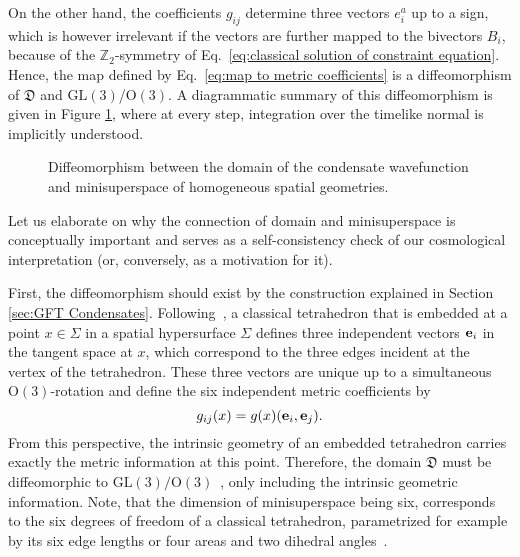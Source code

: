 \documentclass[11pt,a4paper]{article}
\newcommand{\C}{\mathbb C}
\newcommand{\SL}{\text{SL$(2,\C)$}}
\renewcommand{\hom}{\mathfrak{hom}(2)}
\newcommand{\Hom}{\text{Hom}(2)}
\begin{document}
On the other hand, the coefficients $g_{ij}$ determine three vectors $e_i^a$ up to a sign, which is however irrelevant if the vectors are further mapped to the bivectors $B_i$, because of the $\mathbb{Z}_2$-symmetry of Eq.~\eqref{eq:classical solution of constraint equation}. Hence, the map defined by Eq.~\eqref{eq:map to metric coefficients} is a diffeomorphism of $\mathfrak{D}$ and $\text{GL}(3)$/$\text{O}(3)$. A diagrammatic summary of this diffeomorphism is given in Figure \ref{fig: isomorphism of domain and mss}, where at every step, integration over the timelike normal is implicitly understood.

\begin{figure}[ht]
\centering
{}
\caption{Diffeomorphism between the domain of the condensate wavefunction and minisuperspace of homogeneous spatial geometries.}
\label{fig: isomorphism of domain and mss}
\end{figure}

Let us elaborate on why the connection of domain and minisuperspace is conceptually important and serves as a self-consistency check of our cosmological interpretation (or, conversely, as a motivation for it).

First, the diffeomorphism should exist by the construction explained in Section \ref{sec:GFT Condensates}. Following~\cite{Gielen:2013naa}, a classical tetrahedron that is embedded at a point $x\in\Sigma$ in a spatial hypersurface $\Sigma$ defines three independent vectors $\vb{e}_i$ in the tangent space at $x$, which correspond to the three edges incident at the vertex of the tetrahedron. These three vectors are unique up to a simultaneous $\text{O}(3)$-rotation and define the six independent metric coefficients by
%
\begin{equation}
g_{ij}(x)
=
g(x)(\vb{e}_i,\vb{e}_j).
\end{equation}
%
From this perspective, the intrinsic geometry of an embedded tetrahedron carries exactly the metric information at this point.  Therefore, the domain $\mathfrak{D}$ must be diffeomorphic to $\textrm{GL}(3)/\textrm{O}(3)$~\cite{Gielen:2014ila}, only including the intrinsic geometric information. Note, that the dimension of minisuperspace being six, corresponds to the six degrees of freedom of a classical tetrahedron, parametrized for example by its six edge lengths or four areas and two dihedral angles~\cite{Pereira2010}. 
\end{document}
